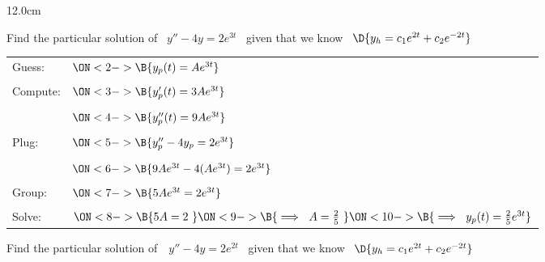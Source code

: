 \begin{frame}
\begin{columns}\begin{column}{12.0cm}

\scriptsize

\EX Find the particular solution of \, $y''-4y=2e^{3t}$ \, given that we know \, $\D{y_h = c_1e^{2t} + c_2e^{-2t}}$

\vspace{0.2cm}

{\setlength{\extrarowheight}{-0.15cm}
\begin{tabular}{p{1.0cm}p{10.6cm}}
	Guess: & $
	\ON<2->{\B{y_p(t) = Ae^{3t}}}$ \\
	&\\
	Compute: & $
	\ON<3->{\B{y_p'(t) = 3Ae^{3t}}} $ \\
	&\\
	& $
	\ON<4->{\B{y_p''(t) = 9Ae^{3t}}} $ \\
	&\\
	Plug: & $
	\ON<5->{\B{y_p''-4y_p=2e^{3t}}} $ \\
	&\\
	& $
	\ON<6->{\B{9Ae^{3t}-4(Ae^{3t})=2e^{3t}}} $ \\
	&\\
	Group: & $
	\ON<7->{\B{5Ae^{3t}=2e^{3t}}} $ \\
	&\\
	Solve: & $
	\ON<8->{\B{5A=2 \,\, }}
	\ON<9->{\B{\implies \,\, A=\frac{2}{5} \,\, }}
	\ON<10->{\B{\implies \,\, y_p(t) = \frac{2}{5}e^{3t} }}$ \\
\end{tabular}}

\vspace{0.6cm}

\EX Find the particular solution of \,\, $y''-4y=2e^{2t}$ \, given that we know \, $\D{y_h = c_1e^{2t} + c_2e^{-2t}}$

\vspace{0.2cm}


\end{column}
\end{columns}
\end{frame}
